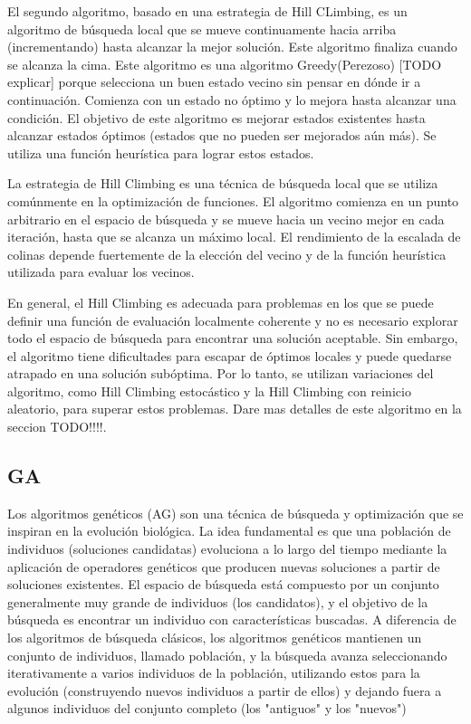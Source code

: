 El segundo algoritmo, basado en una estrategia de Hill CLimbing\cite{TODO, qué citar sobre hill climbing}, es un algoritmo de búsqueda local que se mueve continuamente hacia arriba (incrementando) hasta alcanzar la mejor solución. Este algoritmo finaliza cuando se alcanza la cima. Este algoritmo es una algoritmo Greedy(Perezoso) [TODO explicar] porque selecciona un buen estado vecino sin pensar en dónde ir a continuación. Comienza con un estado no óptimo y lo mejora hasta alcanzar una condición. El objetivo de este algoritmo es mejorar estados existentes hasta alcanzar estados óptimos (estados que no pueden ser mejorados aún más). Se utiliza una función heurística para lograr estos estados.

La estrategia de Hill Climbing es una técnica de búsqueda local que se utiliza comúnmente en la optimización de funciones. El algoritmo comienza en un punto arbitrario en el espacio de búsqueda y se mueve hacia un vecino mejor en cada iteración, hasta que se alcanza un máximo local. El rendimiento de la escalada de colinas depende fuertemente de la elección del vecino y de la función heurística utilizada para evaluar los vecinos.

En general, el Hill Climbing es adecuada para problemas en los que se puede definir una función de evaluación localmente coherente y no es necesario explorar todo el espacio de búsqueda para encontrar una solución aceptable. Sin embargo, el algoritmo tiene dificultades para escapar de óptimos locales y puede quedarse atrapado en una solución subóptima. Por lo tanto, se utilizan variaciones del algoritmo, como Hill Climbing estocástico y la Hill Climbing con reinicio aleatorio, para superar estos problemas.
Dare mas detalles de este algoritmo en la seccion {TODO!!!!}.


\subsection{GA}

Los algoritmos genéticos (AG) son una técnica de búsqueda y optimización que se inspiran en la evolución biológica. La idea fundamental es que una población de individuos (soluciones candidatas) evoluciona a lo largo del tiempo mediante la aplicación de operadores genéticos que producen nuevas soluciones a partir de soluciones existentes. El espacio de búsqueda está compuesto por un conjunto generalmente muy grande de individuos (los candidatos), y el objetivo de la búsqueda es encontrar un individuo con características buscadas. A diferencia de los algoritmos de búsqueda clásicos, los algoritmos genéticos mantienen un conjunto de individuos, llamado población, y la búsqueda avanza seleccionando iterativamente a varios individuos de la población, utilizando estos para la evolución (construyendo nuevos individuos a partir de ellos) y dejando fuera a algunos individuos del conjunto completo (los "antiguos" y los "nuevos")

